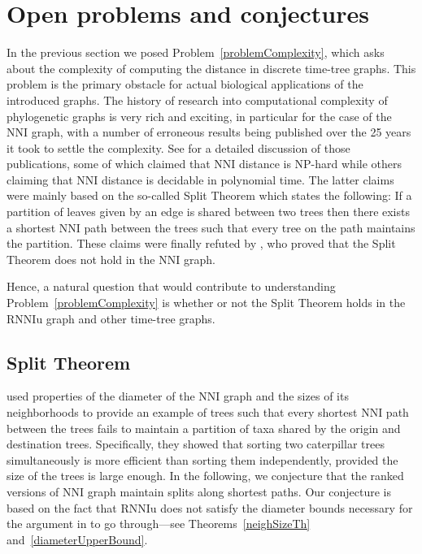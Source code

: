\documentclass[11pt]{amsart}
\theoremstyle{definition}
\newcommand{\nni}{\mathrm{NNI}}
\newcommand{\rnniu}{\mathrm{RNNIu}}
\begin{document}
\section{Open problems and conjectures}

In the previous section we posed Problem~\ref{problemComplexity}, which asks about the complexity of computing the distance in discrete time-tree graphs.
This problem is the primary obstacle for actual biological applications of the introduced graphs.
The history of research into computational complexity of phylogenetic graphs is very rich and exciting, in particular for the case of the $\nni$ graph, with a number of erroneous results being published over the 25 years it took to settle the complexity.
See \autocite{Dasgupta2000-xa} for a detailed discussion of those publications, some of which claimed that $\nni$ distance is NP-hard while others claiming that $\nni$ distance is decidable in polynomial time.
The latter claims were mainly based on the so-called Split Theorem which states the following:
If a partition of leaves given by an edge is shared between two trees then there exists a shortest $\nni$ path between the trees such that every tree on the path maintains the partition.
These claims were finally refuted by \textcite{li1996some}, who proved that the Split Theorem does not hold in the $\nni$ graph.

Hence, a natural question that would contribute to understanding Problem~\ref{problemComplexity} is whether or not the Split Theorem holds in the $\rnniu$ graph and other time-tree graphs.


\subsection{Split Theorem}

\textcite{li1996some} used properties of the diameter of the $\nni$ graph and the sizes of its neighborhoods to provide an example of trees such that every shortest $\nni$ path between the trees fails to maintain a partition of taxa shared by the origin and destination trees.
Specifically, they showed that sorting two caterpillar trees simultaneously is more efficient than sorting them independently, provided the size of the trees is large enough.
In the following, we conjecture that the ranked versions of $\nni$ graph maintain splits along shortest paths.
Our conjecture is based on the fact that $\rnniu$ does not satisfy the diameter bounds necessary for the argument in \autocite{li1996some} to go through---see Theorems~\ref{neighSizeTh} and~\ref{diameterUpperBound}.
\end{document}
